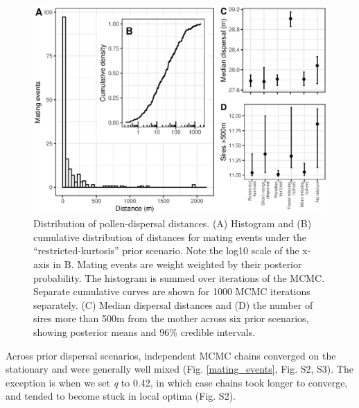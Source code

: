\documentclass[10pt, a4paper, twocolumn]{article} %
\begin{document}
\begin{figure}
    \centering
    \includegraphics{dispersal.eps}
    \caption{Distribution of pollen-dispersal distances.  (A) Histogram and (B) cumulative distribution of distances for mating events under the “restricted-kurtosis” prior scenario. Note the log10 scale of the x-axis in B. Mating events are weight weighted by their posterior probability. The histogram is summed over iterations of the MCMC. Separate cumulative curves are shown for 1000 MCMC iterations separately. (C) Median dispersal distances and (D) the number of sires more than 500m from the mother across six prior scenarios, showing posterior means and 96\% credible intervals.}
    \label{fig:dispersal}
\end{figure}

Across prior dispersal scenarios, independent MCMC chains converged on the stationary and were generally well mixed (Fig. \ref{mating_events}, Fig. S2, S3). The exception is when we set \textit{q} to 0.42, in which case chains took longer to converge, and tended to become stuck in local optima (Fig. S2).
\end{document}
